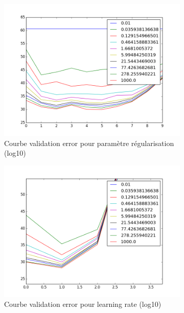 \documentclass[conference]{IEEEtran}
\begin{document}
\begin{figure}[h]
\begin{subfigure}{0.48\columnwidth}
\includegraphics[width=\textwidth]{fig/reg.png}
\caption{Courbe validation error pour paramètre régularisation (log10)}
\end{subfigure}
\begin{subfigure}{0.48\columnwidth}
\includegraphics[width=\textwidth]{fig/lr.png}
\caption{Courbe validation error pour learning rate (log10)}
\end{subfigure}
\begin{subfigure}{0.48\columnwidth}

\end{subfigure}
\end{figure}
\end{document}
